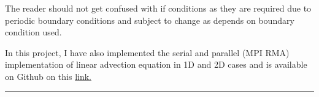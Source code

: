 The reader should not get confused with {\ttfamily if} conditions as they are required due to periodic boundary conditions and subject to change as depends on boundary condition used.

In this project, I have also implemented the serial and parallel (MPI RMA) implementation of linear advection equation in 1D and 2D cases and is available on Github on this \href{https://github.com/Devansh1106/Sample-MPI-Julia/tree/main/linadv}{link.} 
\begin{center}
    \rule{3cm}{1pt}
\end{center}